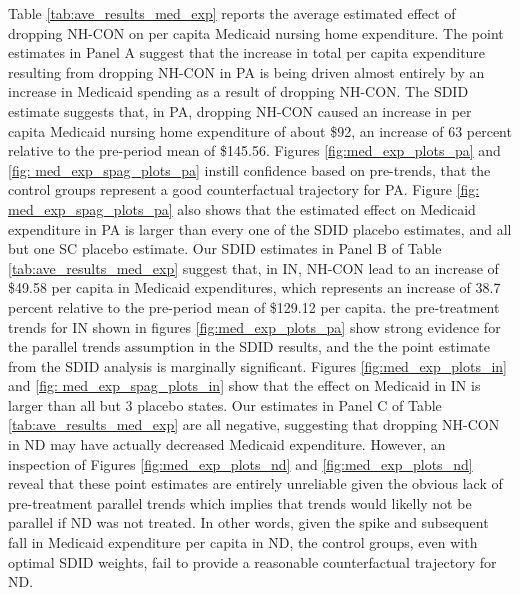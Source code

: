 \documentclass[../Main.tex]{subfiles}
\begin{document}
\indent Table \ref{tab:ave_results_med_exp} reports the average estimated effect of dropping NH-CON on per capita Medicaid nursing home expenditure. The point estimates in Panel A suggest that the increase in total per capita expenditure resulting from dropping NH-CON in PA is being driven almost entirely by an increase in Medicaid spending as a result of dropping NH-CON. The SDID estimate suggests that, in PA, dropping NH-CON caused an increase in per capita Medicaid nursing home expenditure of about \$92, an increase of 63 percent relative to the pre-period mean of \$145.56. Figures \ref{fig:med_exp_plots_pa} and \ref{fig: med_exp_spag_plots_pa} instill confidence based on pre-trends, that the control groups represent a good counterfactual trajectory for PA. Figure \ref{fig: med_exp_spag_plots_pa} also shows that the estimated effect on Medicaid expenditure in PA is larger than every one of the SDID placebo estimates, and all but one SC placebo estimate. Our SDID estimates in Panel B of Table \ref{tab:ave_results_med_exp} suggest that, in IN, NH-CON lead to an increase of \$49.58 per capita in Medicaid expenditures, which represents an increase of 38.7 percent relative to the pre-period mean of \$129.12 per capita. the pre-treatment trends for IN shown in figures \ref{fig:med_exp_plots_pa} show strong evidence for the parallel trends assumption in the SDID results, and the the point estimate from the SDID analysis is marginally significant. Figures \ref{fig:med_exp_plots_in} and \ref{fig: med_exp_spag_plots_in} show that the effect on Medicaid in IN is larger than all but 3 placebo states. Our estimates in Panel C of Table \ref{tab:ave_results_med_exp} are all negative, suggesting that dropping NH-CON in ND may have actually decreased Medicaid expenditure. However, an inspection of Figures \ref{fig:med_exp_plots_nd} and \ref{fig:med_exp_plots_nd} reveal that these point estimates are entirely unreliable given the obvious lack of pre-treatment parallel trends which implies that trends would likelly not be parallel if ND was not treated. In other words, given the spike and subsequent fall in Medicaid expenditure per capita in ND, the control groups, even with optimal SDID weights, fail to provide a reasonable counterfactual trajectory for ND.
\end{document}
